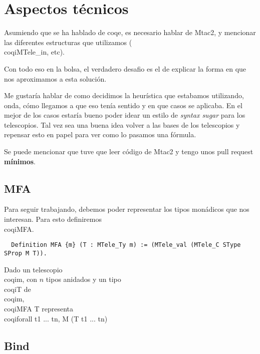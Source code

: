 \section{Aspectos técnicos}

Asumiendo que se ha hablado de coqe, es necesario hablar de Mtac2, y mencionar
las diferentes estructuras que utilizamos (\\coqi{MTele_in}, etc).

Con todo eso en la bolsa, el verdadero desafio es el de explicar la forma en que
nos aproximamos a esta solución.


Me gustaría hablar de como decidimos la heurística que estabamos utilizando,
onda, cómo llegamos a que eso tenía sentido y en que casos se aplicaba.
En el mejor de los casos estaría bueno poder idear un estilo de \textit{syntax
  sugar} para los telescopios.
Tal vez sea una buena idea volver a las bases de los telescopios y repensar esto
en papel para ver como lo pasamos una fórmula.

Se puede mencionar que tuve que leer código de Mtac2 y tengo unos pull request
\textbf{mínimos}.

\subsection{MFA}

Para seguir trabajando, debemos poder representar los tipos monádicos que nos
interesan.
Para esto definiremos \\coqi{MFA}.

\begin{verbatim}
  Definition MFA {m} (T : MTele_Ty m) := (MTele_val (MTele_C SType SProp M T)).
\end{verbatim}

Dado un telescopio \\coqi{m}, con $n$ tipos anidados y un tipo \\coqi{T} de
\\coqi{m}, \\coqi{MFA T} representa \\coqi{forall t1 ... tn, M (T t1 ... tn)}


\subsection{Bind}



